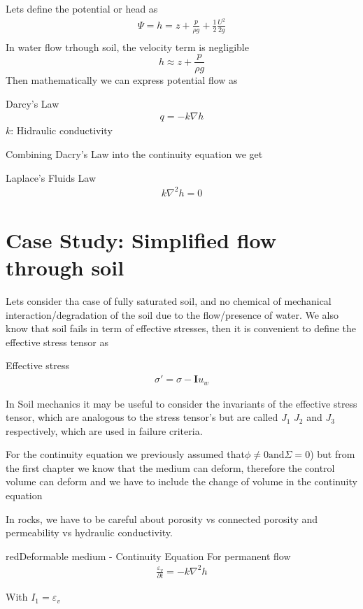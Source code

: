 \documentclass[a4paper, 11pt,article,oneside]{memoir}%
\begin{document}
Lets define the potential or head as
\begin{gather*}
\Psi=h=z+\frac{p}{\rho g}+\frac{1}{2}\frac{U^2}{2g}\\
\end{gather*}
In water flow trhough soil, the velocity term is negligible
$$ h\approx z+\frac{p}{\rho g}$$
Then mathematically we can express potential flow as 
\begin{eqbox2}{}{Darcy's Law}
\begin{gather*}
q=-k\nabla h
\end{gather*}
$k$: Hidraulic conductivity 
\end{eqbox2} 
Combining Dacry's Law into the continuity equation we get 
\begin{eqbox2}{}{Laplace's Fluids Law}
\begin{gather*}
k\nabla^2h=0
\end{gather*}
\end{eqbox2}

\section{Case Study: Simplified flow through soil}
Lets consider tha case of fully saturated soil, and no chemical of mechanical interaction/degradation of the soil due to the flow/presence of water. We also know that soil fails in term of effective stresses, then it is convenient to define the effective stress tensor as
\begin{eqbox2}{}{Effective stress} 
\begin{align*}
\sigma'=\sigma-\boldsymbol{I}u_w
\end{align*}
\end{eqbox2}
In Soil mechanics it may be  useful to consider the invariants of the effective stress tensor, which are analogous to the stress tensor's but are called $J_1$ $J_2$ and $J_3$ respectively, which are used in failure criteria\cite{ICE2614}.

For the continuity equation we previously assumed that$\phi\neq0 \text{and} \Sigma=0$) but from the first chapter we know that the medium can deform, therefore the control volume can deform and we have to include the change of volume in the continuity equation
\begin{note}
In rocks, we have to be careful about porosity vs connected porosity and permeability vs hydraulic conductivity.\end{note} 
\begin{eqbox2}{red}{Deformable medium - Continuity Equation}
For permanent flow
\begin{align*}
\frac{\varepsilon_v}{\partial t}=-k \nabla^2 h
\end{align*}
\end{eqbox2}
With 
$I_1=\varepsilon_v$
\end{document}
